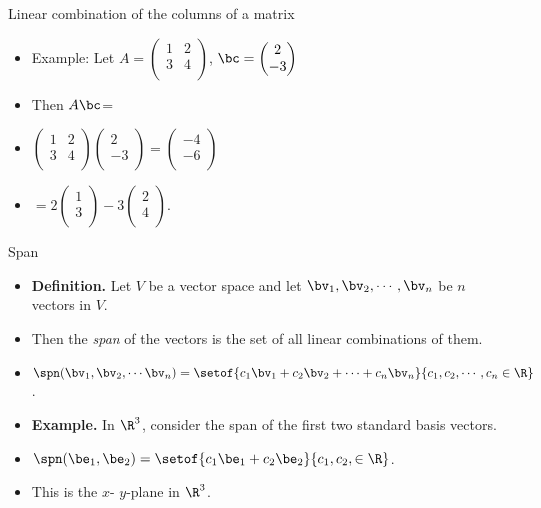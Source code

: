 \documentclass[handout]{beamer}
\begin{document}

\begin{frame}{Linear combination of the columns of a matrix}

\begin{itemize}
\item Example: Let
$A =
\begin{pmatrix}
1 & 2 \\
3 & 4 \\
\end{pmatrix}
$,
$\bc =
\begin{pmatrix}
2 \\
-3 \\
\end{pmatrix}
$
\item Then $A\bc$=
\item
$
\begin{pmatrix}
1 & 2 \\
3 & 4 \\
\end{pmatrix}
\begin{pmatrix}
2 \\
-3 \\
\end{pmatrix}
=
\begin{pmatrix}
-4 \\
-6 \\
\end{pmatrix}
$
\item
$ =
2
\begin{pmatrix}
1 \\
3 \\
\end{pmatrix}
-3
\begin{pmatrix}
2 \\
4 \\
\end{pmatrix}
$.
\end{itemize}
\end{frame}

\begin{frame}{Span}

\begin{itemize}
\item \textbf{Definition.} Let $V$ be a vector space and let $\bv_1,\bv_2,\cdots,\bv_n$ be $n$ vectors in $V$.
\item Then the \emph{span} of the vectors is the set of all linear combinations of them.
\item $\spn(\bv_1,\bv_2,\cdots\bv_n)=\setof{c_1\bv_1+c_2\bv_2+\cdots+c_n\bv_n}{c_1,c_2,\cdots,c_n\in\R}$.
\item \textbf{Example.} In $\R^3$, consider the span of the first two standard basis vectors.
\item $\spn(\be_1,\be_2) = \setof{c_1\be_1+c_2\be_2}{c_1,c_2,\in\R}$.
\item This is the $x$- $y$-plane in $\R^3$.
\end{itemize}

\end{frame}
\end{document}
